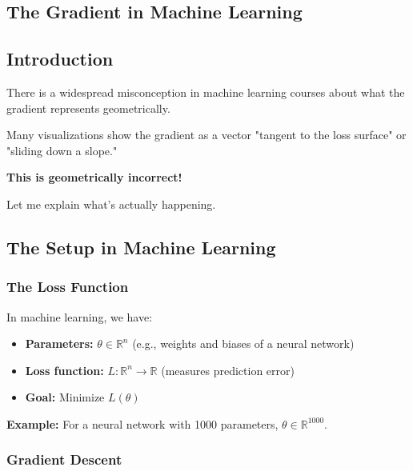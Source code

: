 \begin{notechapter}
\chapter{The Gradient in Machine Learning}\label{ch:gradient-misconception}

\section{Introduction}

There is a widespread misconception in machine learning courses about what
the gradient represents geometrically.

\begin{warning}
Many visualizations show the gradient as a vector "tangent to the loss surface"
or "sliding down a slope." 

\textbf{This is geometrically incorrect!}
\end{warning}

Let me explain what's actually happening.

\section{The Setup in Machine Learning}

\subsection{The Loss Function}

In machine learning, we have:
\begin{itemize}
    \item \textbf{Parameters:} $\theta \in \mathbb{R}^n$ (e.g., weights and biases of a neural network)
    \item \textbf{Loss function:} $L : \mathbb{R}^n \to \mathbb{R}$ (measures prediction error)
    \item \textbf{Goal:} Minimize $L(\theta)$
\end{itemize}

\textbf{Example:} For a neural network with 1000 parameters, $\theta \in \mathbb{R}^{1000}$.

\subsection{Gradient Descent}


\end{notechapter}

